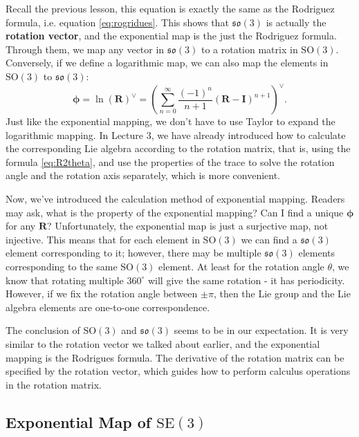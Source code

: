 Recall the previous lesson, this equation is exactly the same as the Rodriguez formula, i.e. equation \eqref{eq:rogridues}. This shows that $\mathfrak{so}(3)$ is actually the \textbf{rotation vector}, and the exponential map is the just the Rodriguez formula. Through them, we map any vector in $\mathfrak{so}(3)$ to a rotation matrix in $\mathrm{SO}(3)$. Conversely, if we define a logarithmic map, we can also map the elements in $\mathrm{SO}(3)$ to $\mathfrak{so}(3)$:
\begin{equation}
\boldsymbol{\phi} = \ln {\left( \mathbf{R} \right)^ \vee } = {\left( {\sum\limits_{n = 0}^\infty {\frac{{{{ \left( { - 1} \right)}^n}}}{{n + 1}}{{\left( { \mathbf{R} - \mathbf{I}} \right)}^{n + 1 }}} } \right)^ \vee }.
\end{equation}
Just like the exponential mapping, we don't have to use Taylor to expand the logarithmic mapping. In Lecture 3, we have already introduced how to calculate the corresponding Lie algebra according to the rotation matrix, that is, using the formula \eqref{eq:R2theta}, and use the properties of the trace to solve the rotation angle and the rotation axis separately, which is more convenient.

Now, we've introduced the calculation method of exponential mapping. Readers may ask, what is the property of the exponential mapping? Can I find a unique $\boldsymbol{\phi}$ for any $\mathbf{R}$? Unfortunately, the exponential map is just a surjective map, not injective. This means that for each element in $\mathrm{SO}(3)$ we can find a $\mathfrak{so}(3)$ element corresponding to it; however, there may be multiple $\mathfrak{so}(3)$ elements corresponding to the same $\mathrm{SO}(3)$ element. At least for the rotation angle $\theta$, we know that rotating multiple $360^\circ$ will give the same rotation - it has periodicity. However, if we fix the rotation angle between $\pm \pi$, then the Lie group and the Lie algebra elements are one-to-one correspondence.

The conclusion of $\mathrm{SO}(3)$ and $\mathfrak{so}(3)$ seems to be in our expectation. It is very similar to the rotation vector we talked about earlier, and the exponential mapping is the Rodrigues formula. The derivative of the rotation matrix can be specified by the rotation vector, which guides how to perform calculus operations in the rotation matrix.

\subsection{Exponential Map of $\mathrm{SE}(3)$}

